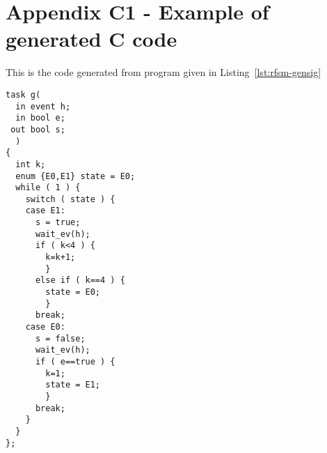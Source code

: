 \chapter*{Appendix C1 - Example of generated C code}  
\label{cha:ex1-c}

This is the code generated from program given in Listing~\ref{lst:rfsm-gensig} 

\begin{lstlisting}[language=ctask,frame=single,numbers=none,basicstyle=\small]
task g(
  in event h;
  in bool e;
 out bool s;
  )
{
  int k;
  enum {E0,E1} state = E0;
  while ( 1 ) {
    switch ( state ) {
    case E1:
      s = true;
      wait_ev(h);
      if ( k<4 ) {
        k=k+1;
        }
      else if ( k==4 ) {
        state = E0;
        }
      break;
    case E0:
      s = false;
      wait_ev(h);
      if ( e==true ) {
        k=1;
        state = E1;
        }
      break;
    }
  }
};
\end{lstlisting}
